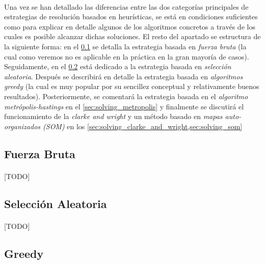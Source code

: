 \documentclass{subfiles}
\begin{document}
      \paragraph{}
      Una vez se han detallado las diferencias entre las dos categorías principales de estrategias de resolución basados en heurísticas, se está en condiciones suficientes como para explicar en detalle algunos de los algoritmos concretos a través de los cuales es posible alcanzar dichas soluciones. El resto del apartado se estructura de la siguiente forma: en el \cref{sec:solving_brute_force} se detalla la estrategia basada en \emph{fuerza bruta} (la cual como veremos no es aplicable en la práctica en la gran mayoría de casos). Seguidamente, en el \cref{sec:solving_random} está dedicado a la estrategia basada en \emph{selección aleatoria}. Después se describirá en detalle la estrategia basada en \emph{algoritmos greedy} (la cual es muy popular por su sencillez conceptual y relativamente buenos resultados). Posteriormente, se comentará la estrategia basada en el \emph{algoritmo metrópolis-hastings} en el \cref{sec:solving_metropolis} y finalmente se discutirá el funcionamiento de la \emph{clarke and wright} y un método basado en \emph{mapas auto-organizados (SOM)} en los \cref{sec:solving_clarke_and_wright,sec:solving_som} 

      \subsection{Fuerza Bruta}
      \label{sec:solving_brute_force}
        
        \paragraph{}
        [TODO]

      \subsection{Selección Aleatoria}
      \label{sec:solving_random}

        \paragraph{}
        [TODO]

      \subsection{Greedy}
      \label{sec:solving_greedy}
\end{document}
